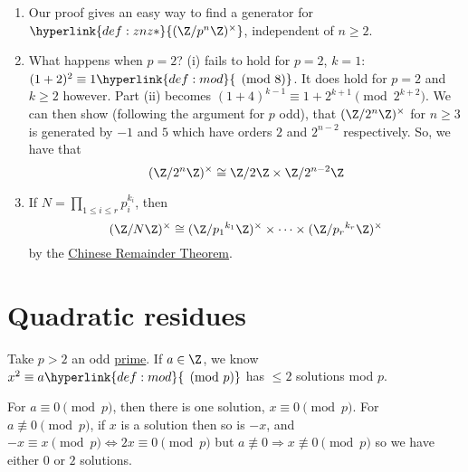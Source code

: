 \documentclass{article}
\begin{document}
\begin{remark}
    \leavevmode
    \begin{enumerate}
        \item Our proof gives an easy way to find a generator for $\hyperlink{def:znz*}{(\Z / p^n \Z)^\times}$, independent of $n \geq 2$.
        \item What happens when $p=2$?
            (i) fails to hold for $p=2$, $k=1$: $(1+2)^2 \equiv 1 \hyperlink{def:mod}{\pmod{8}}$.
            It does hold for $p=2$ and $k \geq 2$ however. Part (ii) becomes $(1+4)^{k-1} \equiv 1 + 2^{k+1} \pmod{2^{k+2}}$.
            We can then show (following the argument for $p$ odd), that $(\Z/2^n \Z)^\times$ for $n \geq 3$ is generated by $-1$ and $5$ which have orders $2$ and $2^{n-2}$ respectively.
            So, we have that
            \begin{equation*}
                (\Z/2^n \Z)^\times \cong \Z/2\Z \times \Z/2^{n-2} \Z
            \end{equation*}
        \item If $N = \prod_{1 \leq i \leq r} p_i^{k_i}$, then
            \begin{equation*}
                (\Z/N \Z)^\times \cong (\Z/{p_1}^{k_1} \Z)^\times \times \dotsm \times (\Z/{p_r}^{k_r} \Z)^\times
            \end{equation*}
            by the \hyperlink{thm:crt}{Chinese Remainder Theorem}.
    \end{enumerate}
\end{remark}

\clearpage

\section{Quadratic residues}
Take $p > 2$ an odd \hyperlink{def:prime}{prime}. If $a \in \Z$, we know $x^2 \equiv a \hyperlink{def:mod}{\pmod{p}}$ has $\leq 2$ solutions mod $p$.

For $a \equiv 0 \pmod{p}$, then there is one solution, $x \equiv 0 \pmod{p}$.
For $a \not \equiv 0 \pmod{p}$, if $x$ is a solution then so is $-x$, and $-x \equiv x \pmod{p} \Leftrightarrow 2x \equiv 0 \pmod{p}$ but $a \not\equiv 0 \Rightarrow x \not\equiv 0 \pmod{p}$ so we have either $0$ or $2$ solutions.

\end{document}
